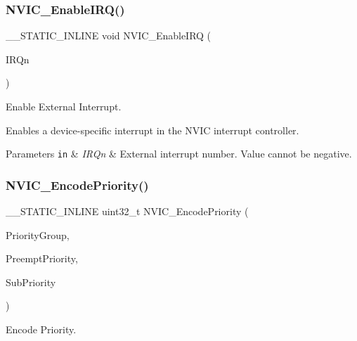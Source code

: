 \subsubsection{\texorpdfstring{N\+V\+I\+C\+\_\+\+Enable\+I\+R\+Q()}{NVIC\_EnableIRQ()}}
{\footnotesize\ttfamily \+\_\+\+\_\+\+S\+T\+A\+T\+I\+C\+\_\+\+I\+N\+L\+I\+NE void N\+V\+I\+C\+\_\+\+Enable\+I\+RQ (\begin{DoxyParamCaption}\item[{\mbox{\hyperlink{group___peripheral__interrupt__number__definition_ga7e1129cd8a196f4284d41db3e82ad5c8}{I\+R\+Qn\+\_\+\+Type}}}]{I\+R\+Qn }\end{DoxyParamCaption})}



Enable External Interrupt. 

Enables a device-\/specific interrupt in the N\+V\+IC interrupt controller. 
\begin{DoxyParams}[1]{Parameters}
\mbox{\tt in}  & {\em I\+R\+Qn} & External interrupt number. Value cannot be negative. \\
\hline
\end{DoxyParams}
\mbox{\label{group___c_m_s_i_s___core___n_v_i_c_functions_gadb94ac5d892b376e4f3555ae0418ebac}} 
\subsubsection{\texorpdfstring{N\+V\+I\+C\+\_\+\+Encode\+Priority()}{NVIC\_EncodePriority()}}
{\footnotesize\ttfamily \+\_\+\+\_\+\+S\+T\+A\+T\+I\+C\+\_\+\+I\+N\+L\+I\+NE uint32\+\_\+t N\+V\+I\+C\+\_\+\+Encode\+Priority (\begin{DoxyParamCaption}\item[{uint32\+\_\+t}]{Priority\+Group,  }\item[{uint32\+\_\+t}]{Preempt\+Priority,  }\item[{uint32\+\_\+t}]{Sub\+Priority }\end{DoxyParamCaption})}



Encode Priority. 

